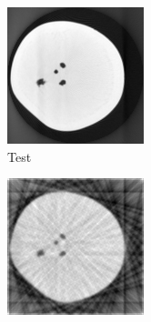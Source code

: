 \documentclass{article}
\begin{document}
\begin{figure}[!h]
    \begin{subfigure}[b]{0.3\linewidth}
        \includegraphics[width=\textwidth]{../images/potato/2D/cs_blurred_results/24_views/testIm.png}
        \caption{Test}
     \end{subfigure}
\quad
    \begin{subfigure}[b]{0.3\linewidth}
        \includegraphics[width=\textwidth]{../images/potato/2D/cs_blurred_results/24_views/result_FBP.png}

\end{subfigure}
\end{figure}
\end{document}
